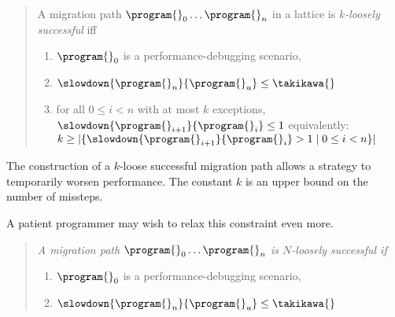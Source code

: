 \begin{quote} \em

A migration path ${\program{}_0} \ldots {\program{}_n}$ in a
lattice  is \emph{$k$-loosely successful}
iff 
\begin{enumerate}
  \item  $\program{}_0$ is a performance-debugging scenario,
  \item $\slowdown{\program{}_n}{\program{}_u} \leq \takikawa{}$  
  \item
      for all $0 \leq i < n$ with at most $k$ exceptions,
      $\slowdown{\program{}_{i+1}}{\program{}_{i}} \leq 1$
      \subitem equivalently: $k \geq |\{ \slowdown{\program{}_{i+1}}{\program{}_{i}} > 1 \mid 0 \leq i < n\}|$
  \end{enumerate} 
\end{quote}
The construction of a $k$-loose successful migration path allows a strategy to
temporarily worsen performance. The constant $k$ is an
upper bound on the number of missteps.

A patient programmer may wish to relax this constraint even more.

\begin{quote} \em
A migration path ${\program{}_0} \ldots {\program{}_n}$ is $N$-loosely successful if 
  \begin{enumerate}
  \item  $\program{}_0$ is a performance-debugging scenario,
  \item $\slowdown{\program{}_n}{\program{}_u} \leq \takikawa{}$  
  \end{enumerate}
\end{quote}

